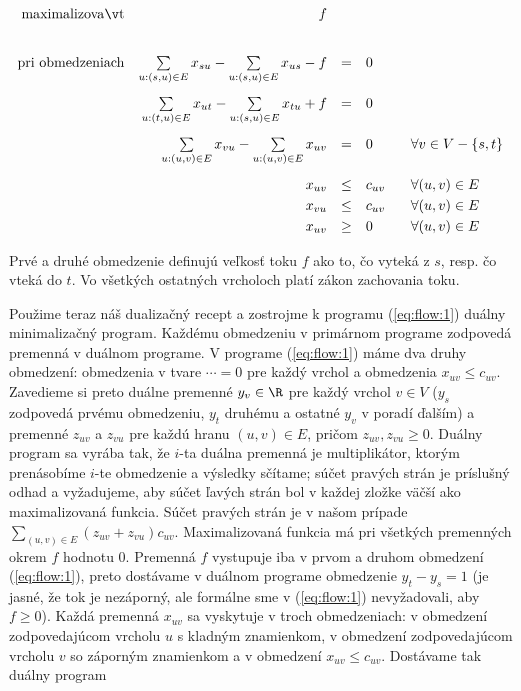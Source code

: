 \begin{equation}
  \label{eq:flow:1}
  \begin{array}{rrcll}
      {\rm maximalizovať}     & \multicolumn{1}{r}{f}\\[8mm]
    {\rm pri\ obmedzeniach} & \sum\limits_{u:(s,u)\in E} x_{su} - \sum\limits_{u:(s,u)\in E} x_{us} - f  &=&0&  \\[6mm]
                            & \sum\limits_{u:(t,u)\in E} x_{ut} - \sum\limits_{u:(s,u)\in E} x_{tu} + f  &=&0&  \\[6mm]
                            & \sum\limits_{u:(u,v)\in E} x_{vu} - \sum\limits_{u:(u,v)\in E} x_{uv} &=&0&\;\;\;
    \forall v\in V - \{s,t\}\\[6mm]
    & x_{uv}&\le& c_{uv}&  \;\;\;\forall (u,v)\in E\\[1mm]
    & x_{vu}&\le& c_{uv}&  \;\;\;\forall (u,v)\in E\\[1mm]
                            & x_{uv}&\ge& 0 &  \;\;\;\forall (u,v)\in E\\
  \end{array}
\end{equation}  

\noindent
Prvé a druhé obmedzenie definujú veľkosť toku $f$ ako to, čo vyteká z $s$, resp. čo vteká do $t$. Vo všetkých
ostatných vrcholoch platí zákon zachovania toku. 

\noindent
Použime teraz náš dualizačný recept a zostrojme k programu (\ref{eq:flow:1}) duálny minimalizačný program. 
Každému obmedzeniu v primárnom programe zodpovedá premenná v duálnom programe.
V programe (\ref{eq:flow:1}) máme dva druhy obmedzení: obmedzenia v tvare $\cdots = 0$ pre každý vrchol
a obmedzenia $x_{uv}\le c_{uv}$. Zavedieme si preto duálne premenné $y_v\in\R$ pre každý vrchol $v\in V$
($y_s$ zodpovedá prvému obmedzeniu, $y_t$ druhému a ostatné $y_v$ v poradí ďalším)
a premenné $z_{uv}$ a $z_{vu}$ pre každú hranu $(u,v)\in E$, pričom $z_{uv},z_{vu}\ge0$.
Duálny program sa vyrába tak, že $i$-ta duálna premenná je  multiplikátor, ktorým prenásobíme
$i$-te obmedzenie a výsledky sčítame; súčet pravých strán je príslušný odhad a vyžadujeme, aby
súčet ľavých strán bol v každej zložke väčší ako maximalizovaná funkcia.
Súčet pravých strán je v našom prípade $\sum\limits_{(u,v)\in E}(z_{uv}+z_{vu})c_{uv}$.
Maximalizovaná funkcia má pri všetkých premenných okrem $f$ hodnotu 0. 
Premenná $f$ vystupuje iba v prvom a druhom obmedzení (\ref{eq:flow:1}), preto dostávame
v duálnom programe obmedzenie $y_t-y_s=1$ (je jasné, že tok je nezáporný, ale formálne sme 
v (\ref{eq:flow:1}) nevyžadovali, aby $f\ge0$). Každá premenná $x_{uv}$ sa vyskytuje v 
troch obmedzeniach: v obmedzení zodpovedajúcom vrcholu $u$ s kladným znamienkom,  v obmedzení
zodpovedajúcom vrcholu $v$ so záporným znamienkom a v obmedzení $x_{uv}\le c_{uv}$. Dostávame
tak duálny program


